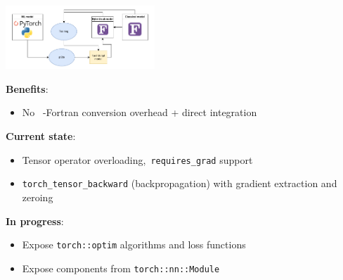 \begin{tikzfigure}
    \includegraphics[width=0.42\textwidth]{figures/online-training-diagram.pdf}
\end{tikzfigure}
\textbf{Benefits}:
\begin{itemize}
    \item No \faPython~-Fortran conversion overhead + direct integration
\end{itemize}
\textbf{Current state}:
\begin{itemize}
    \item Tensor operator overloading,~\texttt{requires\_grad} support
    \item \texttt{torch\_tensor\_backward} (backpropagation) with gradient extraction and zeroing
\end{itemize}
\textbf{In progress}:
\begin{itemize}
    \item Expose \texttt{torch::optim} algorithms and loss functions
    \item Expose components from \texttt{torch::nn::Module}
\end{itemize}
